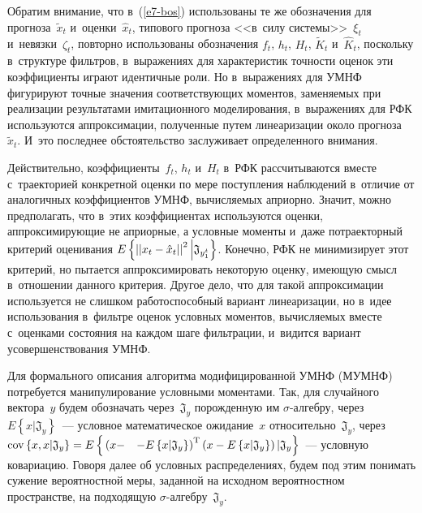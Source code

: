 \begin{multicols}{2}
    Обратим внимание, что в~(\ref{e7-bos}) использованы те же обозначения 
для прогноза~$\tilde{x}_t$ и~оценки~$\hat{x}_t$, типового прогноза <<в~силу 
системы>>~$\xi_t$ и~невязки~$\zeta_t$, повторно использованы обозначения 
$f_t$, $h_t$, $H_t$, $\tilde{K}_t$ и~$\hat{K}_t$, поскольку в~структуре 
фильтров, в~выражениях для характеристик точности оценок эти коэффициенты 
играют идентичные роли. Но в~выражениях для УМНФ фигурируют точные 
значения соответствующих моментов, заменяемых при реализации 
результатами имитационного моделирования, в~выражениях для РФК 
используются аппроксимации, полученные путем линеаризации около 
прогноза~$\tilde{x}_t$. И~это последнее обстоятельство заслуживает 
определенного внимания.
    
    Действительно, коэффициенты~$f_t$, $h_t$ и~$H_t$ в~РФК рассчитываются 
вместе с~траекторией конкретной оценки по мере поступления наблюдений 
в~отличие от аналогичных коэффициентов УМНФ, вы\-чис\-ля\-емых априорно. 
Значит, можно предполагать, что в~этих коэффициентах используются оценки, 
аппроксимирующие не априорные, а условные моменты и~даже потраекторный 
критерий оценивания $E\left\{ \left\vert \left\vert x_t \hm-
\hat{x}_t\right\vert\right\vert^2\Big\vert \mathfrak{J}_{y_1^t}\right\}$. Конечно, РФК 
не минимизирует этот критерий, но пытается аппроксимировать некоторую 
оценку, имеющую смысл в~отношении данного критерия. Другое дело, что для 
такой аппроксимации используется не слишком работоспособный вариант 
линеаризации, но в~идее использования в~фильтре оценок условных моментов, 
вычисляемых вместе с~оценками состояния на каждом шаге фильтрации, 
и~видится вариант усовершенствования УМНФ.
    
    Для формального описания алгоритма модифицированной УМНФ 
(МУМНФ) потребуется манипулирование условными моментами. Так, для 
случайного вектора~$y$   будем обозначать через~$\mathfrak{J}_y$ порожденную 
им $\sigma$-ал\-геб\-ру, через $E\left\{ x\vert \mathfrak{J}_y\right\}$~--- 
условное математическое ожидание~$x$ относительно~$\mathfrak{J}_y$, через 
$\mathrm{cov}\left \{ x, x\vert \mathfrak{J}_y\right\}\hm=
E\left\{ 
\vphantom{\left(\left\{ x\vert \mathfrak{J}_y\right\}\right)^{\mathrm{T}}}
\left( x\hm-\right.\right.$\linebreak
$\left.\left.-E\left\{ x\vert \mathfrak{J}_y\right\}\right)^{\mathrm{T}}\left(
x\hm- E\left\{ x\vert \mathfrak{J}_y\right\} \right)\vert \mathfrak{J}_y\right\}$~--- условную ковариацию. Говоря далее об 
условных распределениях, будем под этим понимать сужение вероятностной 
меры, заданной на исходном вероятностном пространстве, на подходящую 
$\sigma$-ал\-геб\-ру~$\mathfrak{J}_y$.
    

\end{multicols}

